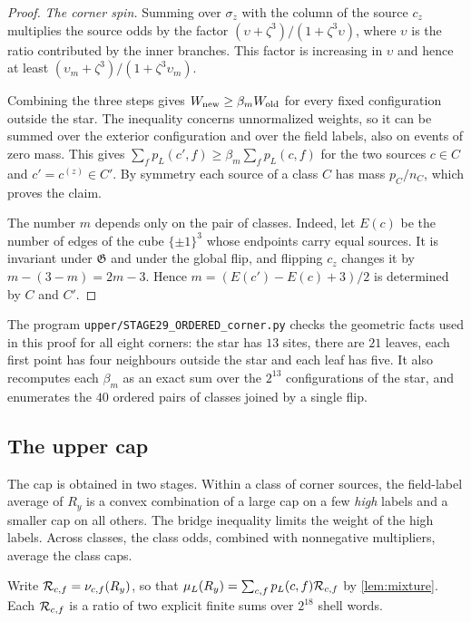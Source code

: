 \begin{proof}
\emph{The corner spin.} Summing over $\sigma_z$ with the column of the source $c_z$ multiplies the source odds by the factor $(\upsilon+\zeta^3)/(1+\zeta^3\upsilon)$, where $\upsilon$ is the ratio contributed by the inner branches. This factor is increasing in $\upsilon$ and hence at least $(\upsilon_m+\zeta^3)/(1+\zeta^3\upsilon_m)$.

Combining the three steps gives $W_{\rm new}\ge\beta_mW_{\rm old}$ for every fixed configuration outside the star. The inequality concerns unnormalized weights, so it can be summed over the exterior configuration and over the field labels, also on events of zero mass. This gives $\sum_fp_L(c',f)\ge\beta_m\sum_fp_L(c,f)$ for the two sources $c\in C$ and $c'=c^{(z)}\in C'$. By symmetry each source of a class $C$ has mass $p_C/n_C$, which proves the claim.

The number $m$ depends only on the pair of classes. Indeed, let $E(c)$ be the number of edges of the cube $\{\pm1\}^3$ whose endpoints carry equal sources. It is invariant under $\mathfrak G$ and under the global flip, and flipping $c_z$ changes it by $m-(3-m)=2m-3$. Hence $m=(E(c')-E(c)+3)/2$ is determined by $C$ and $C'$.
\end{proof}

The program \nolinkurl{upper/STAGE29_ORDERED_corner.py} checks the geometric facts used in this proof for all eight corners: the star has $13$ sites, there are $21$ leaves, each first point has four neighbours outside the star and each leaf has five. It also recomputes each $\beta_m$ as an exact sum over the $2^{13}$ configurations of the star, and enumerates the $40$ ordered pairs of classes joined by a single flip.

\subsection{The upper cap}\label{sec:cap}

The cap is obtained in two stages. Within a class of corner sources, the field-label average of $R_y$ is a convex combination of a large cap on a few \emph{high} labels and a smaller cap on all others. The bridge inequality limits the weight of the high labels. Across classes, the class odds, combined with nonnegative multipliers, average the class caps.

Write $\mathcal R_{c,f}=\nu_{c,f}(R_y)$, so that $\mu_L(R_y)=\sum_{c,f}p_L(c,f)\mathcal R_{c,f}$ by \cref{lem:mixture}. Each $\mathcal R_{c,f}$ is a ratio of two explicit finite sums over $2^{18}$ shell words.

